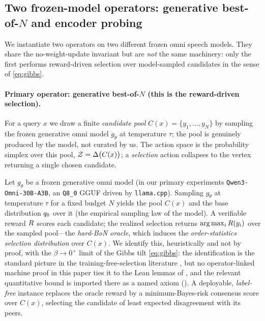 \subsection{Two frozen-model operators: generative best-of-$N$ and encoder probing}
\label{subsec:operator}

We instantiate two operators on two different frozen omni speech models. They share the no-weight-update invariant but are \emph{not} the same machinery: only the first performs reward-driven selection over model-sampled candidates in the sense of \eqref{eq:gibbs}.

\paragraph{Primary operator: generative best-of-$N$ (this is the reward-driven selection).}
For a query $x$ we draw a finite \emph{candidate pool} $C(x)=\{y_1,\dots,y_N\}$ by sampling the frozen generative omni model $g_\theta$ at temperature $\tau$; the pool is genuinely produced by the model, not curated by us. The action space is the probability simplex over this pool, $\mathcal{Z} = \Delta\big(C(x)\big)$; a \emph{selection} action collapses to the vertex returning a single chosen candidate.

\begin{definition}
\label{def:operator}
Let $g_\theta$ be a frozen generative omni model (in our primary experiments \texttt{Qwen3-Omni-30B-A3B}, an \texttt{Q8\_0} GGUF driven by \texttt{llama.cpp}). Sampling $g_\theta$ at temperature $\tau$ for a fixed budget $N$ yields the pool $C(x)$ and the base distribution $q_{0}$ over it (the empirical sampling law of the model). A verifiable reward $R$ scores each candidate; the realized selection returns $\arg\max_i R(y_i)$ over the sampled pool---the \emph{hard-BoN oracle}, which induces the \emph{order-statistics selection distribution} over $C(x)$. We identify this, heuristically and not by proof, with the $\beta\to 0^+$ limit of the Gibbs tilt \eqref{eq:gibbs}: the identification is the standard picture in the training-free-selection literature \citep{beirami2024bon}, but no operator-linked machine proof in this paper ties it to the Lean lemmas of , and the relevant quantitative bound is imported there as a named axiom (). A deployable, \emph{label-free} instance replaces the oracle reward by a minimum-Bayes-risk consensus score over $C(x)$, selecting the candidate of least expected disagreement with its peers.
\end{definition}

